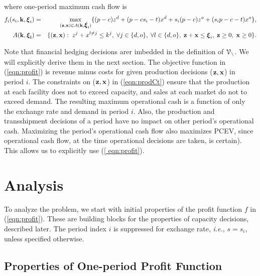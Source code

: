 \documentclass[mnsc,nonblindrev,copyedit]{informs2_wz} %
\newcommand{\xiv}{\mbox{\boldmath$\xi$}}
\newcommand{\V}{\cal{V}}
\begin{document}
where one-period maximum cash flow is
\begin{eqnarray}
f_i(s_i,\bold k, \xiv_i) &=& \max_{(\bold{z,x}) \in A (\bold {k, \xiv_i})} \{(p-c)z^{d}+ (p-cs_i-t)x^{d} + s_i(p-c)z^{o}+(s_i p-c-t)x^{o} \},\label{eqn:profit} \\
 A(\bold{k,\xiv_i}) &=& \{ (\bold {z,x}): \; z^{j} + x^{l\neq j} \leq k^j, \; \forall j\in \{d,o\},\; \forall l\in \{d,o\}, \; \bold z+ \bold x \leq \xiv_i,\; \bold z \geq 0, \; \bold x \geq 0\}. \label{eqn:prodCt}
\end{eqnarray}

Note that financial hedging decisions arer imbedded in the definition of $\V_n$.  We will explicitly derive them in the next section.  The objective function in (\ref{eqn:profit}) is revenue minus costs for given production decisions ($\bold{z,x}$) in period $i$.  The constraints on ($\bold{z,x}$) in (\ref{eqn:prodCt}) ensure that the production at each facility does not to exceed capacity, and sales at each market do not to exceed demand.  
The resulting maximum operational cash is a function of only the exchange rate and demand in  period $i$.  Also, the production and transshipment decisions of a period have no impact on other period's operational cash.  Maximizing the period's operational cash flow also maximizes PCEV, since operational cash flow, at the time operational decisions are taken, is certain).  This allows us to explicitly use (\ref{ eqn:profit}).








\section{Analysis}







To analyze the problem, we start with initial properties of the profit function $f$ in (\ref{eqn:profit}).  These are building blocks for  the properties of capacity decisions, described later.  The period index $i$ is suppressed for exchange rate, {\it i.e.}, $s= s_i$, unless specified otherwise.





\subsection{Properties of One-period Profit Function}
\end{document}

